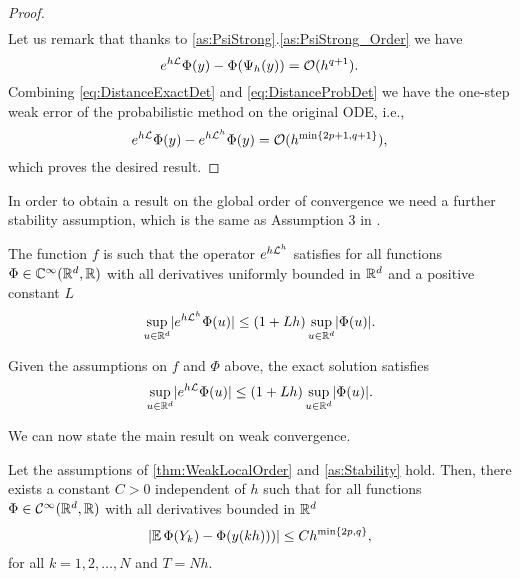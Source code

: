 \documentclass[10pt]{article}
\begin{document}
\begin{proof}
\begin{equation}
\begin{aligned}
		\end{aligned}
	\end{equation}
	Let us remark that thanks to \cref{as:PsiStrong}.\ref{as:PsiStrong_Order} we have
	\begin{equation}\label{eq:DistanceExactDet}
		e^{h\mathcal{L}}\Phi(y) - \Phi(\Psi_h(y)) = \mathcal{O}(h^{q+1}).
	\end{equation}
	Combining \eqref{eq:DistanceExactDet} and \eqref{eq:DistanceProbDet} we have the one-step weak error of the probabilistic method on the original ODE, i.e., 
	\begin{equation}\label{eq:LocalWeakError}
		e^{h\mathcal{L}}\Phi(y) - e^{h\mathcal{L}^h}\Phi(y) = \mathcal{O}(h^{\min\{2p+1, q+1\}}),
	\end{equation}
	which proves the desired result.
\end{proof}

In order to obtain a result on the global order of convergence we need a further stability assumption, which is the same as Assumption 3 in \cite{CGS16}.

\begin{assumption}\label{as:Stability} The function $f$ is such that the operator $e^{h\mathcal{L}^h}$ satisfies for all functions $\Phi\in\mathbb{C}^{\infty}(\mathbb{R}^d, \mathbb{R})$ with all derivatives uniformly bounded in $\mathbb{R}^d$ and a positive constant $L$
	\begin{equation}
		\sup_{u\in\mathbb{R}^d} \lvert e^{h\mathcal{L}^h}\Phi(u)\rvert \leq (1 + Lh)\sup_{u\in\mathbb{R}^d}\lvert\Phi(u)\rvert.
	\end{equation}
\end{assumption}
\begin{remark} Given the assumptions on $f$ and $\Phi$ above, the exact solution satisfies
	\begin{equation}
		\sup_{u\in\mathbb{R}^d} \lvert e^{h\mathcal{L}}\Phi(u)\rvert \leq (1 + Lh)\sup_{u\in\mathbb{R}^d}\lvert\Phi(u)\rvert.
	\end{equation}
\end{remark}

We can now state the main result on weak convergence. 

\begin{theorem}\label{thm:weakOrder} Let the assumptions of \cref{thm:WeakLocalOrder} and \cref{as:Stability} hold. Then, there exists a constant $C > 0$ independent of $h$ such that for all functions $\Phi \in \mathcal{C}^\infty(\mathbb{R}^d,\mathbb{R})$ with all derivatives bounded in $\mathbb{R}^d$
	\begin{equation}
		\lvert\operatorname{\mathbb{E}}\Phi(Y_k) - \Phi(y(kh)))\rvert \leq Ch^{\min\{2p, q\}},
	\end{equation}
	for all $k = 1, 2, \ldots, N$ and $T = Nh$.
\end{theorem}
	
\end{document}

